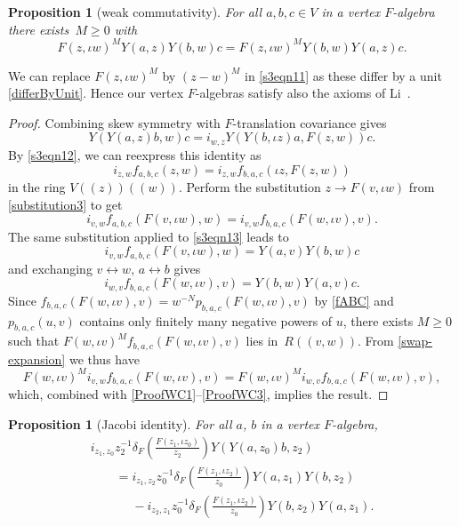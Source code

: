 \documentclass[10pt,a4paper]{amsart}
\numberwithin{equation}{section}
\newtheorem{Proposition}[Theorem]{Proposition}
\theoremstyle{definition}
\begin{document}
\begin{Proposition}[weak commutativity]
 For all $a,b,c\in V$ in a vertex $F$-algebra there exists~${M\geqslant0}$ with
\begin{equation}\label{s3eqn11}
 F(z,\iota w)^M Y(a,z)Y(b,w)c=F(z,\iota w)^M Y(b,w)Y(a,z)c.
\end{equation}
\end{Proposition}

We can replace $F(z,\iota w)^M$ by $(z-w)^M$ in \eqref{s3eqn11} as these differ by a unit \eqref{differByUnit}. Hence our vertex $F$-algebras satisfy also the axioms of Li~\cite{Li}.

\begin{proof}
 Combining skew symmetry with $F$-translation covariance gives
 \[
 Y(Y(a,z)b,w)c%
 =i_{w,z} Y(Y(b,\iota z)a,F(z,w))c.
 \]
 By \eqref{s3eqn12}, we can reexpress this identity as
 \begin{equation}
 \label{wcc-eqn}
 i_{z,w}f_{a,b,c}(z,w)= i_{z,w}f_{b,a,c}(\iota z,F(z,w))
 \end{equation}
 in the ring $V(\!( z)\!)(\!( w)\!)$. Perform the substitution $z\to F(v,\iota w)$ from \eqref{substitution3} to get
 \begin{equation}
 \label{ProofWC1}
 i_{v,w}f_{a,b,c}(F(v,\iota w),w)=i_{v,w}f_{b,a,c}(F(w,\iota v),v).
 \end{equation}
 The same substitution applied to \eqref{s3eqn13} leads to
 \begin{equation}
 \label{ProofWC2}
 i_{v,w}f_{a,b,c}(F(v,\iota w),w)=Y(a,v)Y(b,w)c
 \end{equation}
 and exchanging $v\leftrightarrow w$, $a\leftrightarrow b$ gives
 \begin{equation}
 \label{ProofWC3}
 i_{w,v}f_{b,a,c}(F(w,\iota v),v)=Y(b,w)Y(a,v)c.
 \end{equation}
 Since $f_{b,a,c}(F(w,\iota v),v)=w^{-N}p_{b,a,c}(F(w,\iota v),v)$ by \eqref{fABC} and $p_{b,a,c}(u,v)$ contains only finitely many negative powers of $u$, there exists $M\geqslant0$ such that $F(w,\iota v)^M f_{b,a,c}(F(w,\iota v),v)$ lies in~${R(\!( v,w)\!)}$. From \eqref{swap-expansion} we thus have
 \[
 F(w,\iota v)^M i_{v,w}f_{b,a,c}(F(w,\iota v),v) = F(w,\iota v)^M i_{w,v}f_{b,a,c}(F(w,\iota v),v),
 \]
 which, combined with \eqref{ProofWC1}--\eqref{ProofWC3}, implies the result.
\end{proof}

\begin{Proposition}[Jacobi identity]
For all $a$, $b$ in a vertex $F$-algebra,
\begin{gather*}
i_{z_1,z_0}z_2^{-1}\delta_F\left(\frac{F(z_1,\iota z_0)}{z_2}\right)Y(Y(a,z_0)b,z_2)\\
\qquad=i_{z_1,z_2}z_0^{-1}\delta_F\left(\frac{F(z_1,\iota z_2)}{z_0}\right)Y(a,z_1)Y(b,z_2)\\
\phantom{\qquad=}{}-i_{z_2,z_1}z_0^{-1}\delta_F\left(\frac{F(z_1,\iota z_2)}{z_0}\right)Y(b,z_2)Y(a,z_1).
\end{gather*}
\end{Proposition}
\end{document}
